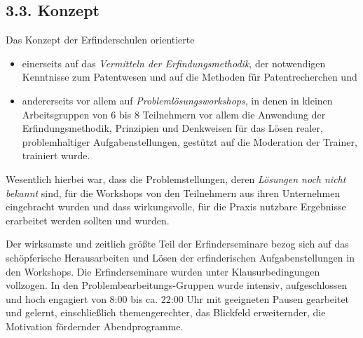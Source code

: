 \documentclass[11pt,a4paper]{article}
\begin{document}
\subsection*{3.3. Konzept}
Das Konzept der Erfinderschulen orientierte
\begin{itemize}
\item einerseits auf das \emph{Vermitteln der Erfindungsmethodik}, der
  notwendigen Kenntnisse zum Patentwesen und auf die Methoden für
  Patentrecherchen und
\item andererseits vor allem auf \emph{Problemlösungsworkshops}, in denen in
  kleinen Arbeitsgruppen von 6 bis 8 Teilnehmern vor allem die Anwendung der
  Erfindungsmethodik, Prinzipien und Denkweisen für das Lösen realer,
  problemhaltiger Aufgabenstellungen, gestützt auf die Moderation der Trainer,
  trainiert wurde.
\end{itemize}
Wesentlich hierbei war, dass die Problemstellungen, deren \emph{Lösungen noch
nicht bekannt} sind, für die Workshops von den Teilnehmern aus ihren
Unternehmen eingebracht wurden und dass wirkungsvolle, für die Praxis nutzbare
Ergebnisse erarbeitet werden sollten und wurden.

Der wirksamste und zeitlich größte Teil der Erfinderseminare bezog sich auf
das schöpferische Herausarbeiten und Lösen der erfinderischen
Aufgabenstellungen in den Workshops. Die Erfinderseminare wurden unter
Klausurbedingungen vollzogen. In den Problembearbeitungs-Gruppen wurde
intensiv, aufgeschlossen und hoch engagiert von 8:00 bis ca. 22:00 Uhr mit
geeigneten Pausen gearbeitet und gelernt, einschließlich themengerechter, das
Blickfeld erweiternder, die Motivation fördernder Abendprogramme.
\end{document}

